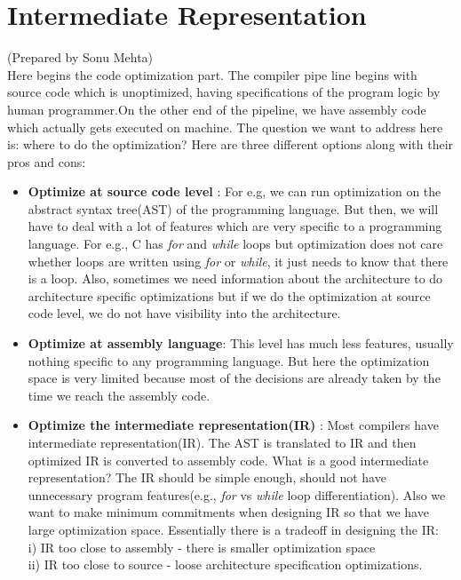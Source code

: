 \section{Intermediate Representation}
(Prepared by Sonu Mehta)\\
Here begins the code optimization part. The compiler pipe line begins with source code which is unoptimized, having specifications of the program logic by human programmer.On the other end of the pipeline, we have assembly code which actually gets executed on machine. The question we want to address here is: where to do the optimization? Here are three different options along with their pros and cons:


\begin{itemize}
    \item \textbf{Optimize at source code level} : For e.g, we can run optimization on  the abstract syntax tree(AST) of the programming language. But then, we will have to deal with a lot of features which are very specific to a programming language. For e.g., C has \emph{for} and \emph{while} loops but optimization does not care whether loops are written using \emph{for} or \emph{while}, it just needs to know that there is a loop.
    Also, sometimes we need information about the architecture to do architecture specific optimizations but if we do the optimization at source code level, we do not have visibility into the architecture. 
    \item \textbf{Optimize at assembly language}: This level has much less features, usually nothing specific to any programming language. But here the optimization space is very limited because most of the decisions are already taken by the time we reach the assembly code. 
    \item \textbf{Optimize the intermediate representation(IR)} : Most compilers have intermediate representation(IR). The AST is translated to IR and then optimized IR is converted to assembly code. 
    What is a good intermediate representation? The IR should be simple enough, should not have unnecessary program features(e.g., \emph{for} vs \emph{while} loop differentiation). Also we want to make minimum commitments when designing IR so that we have large optimization space.
    Essentially there is a tradeoff in designing the IR:\\
    i) IR too close to assembly - there is smaller optimization space\\
    ii) IR too close to source - loose architecture specification optimizations.
\end{itemize}
